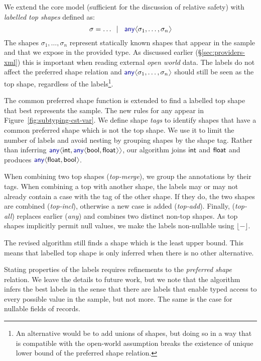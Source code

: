 \documentclass[10pt,nocopyrightspace]{sigplanconf}
\newcommand{\langl}{\begin{picture}(4.5,7)
\put(1.1,2.5){\rotatebox{60}{\line(1,0){5.5}}}
\put(1.1,2.5){\rotatebox{300}{\line(1,0){5.5}}}
\end{picture}}
\newcommand{\rangl}{\begin{picture}(4.5,7)
\put(.9,2.5){\rotatebox{120}{\line(1,0){5.5}}}
\put(.9,2.5){\rotatebox{240}{\line(1,0){5.5}}}
\end{picture}}
\newcommand{\kvd}[1]{\textnormal{\textcolor{kvdclr}{\sffamily #1}}}
\newcommand{\ident}[1]{\textnormal{\sffamily #1}}
\newcommand{\lsep}[0]{\;\; | \;\;}
\newcommand{\dropopt}[1]{\lfloor#1\rfloor}
\begin{document}
We extend the core model (sufficient for the discussion of relative safety) with \emph{labelled top
shapes} defined as:
\begin{equation*}
\sigma = \ldots \lsep \kvd{any}\langl \sigma_1, \ldots, \sigma_n\rangl
\end{equation*}
The shapes $\sigma_1, \ldots, \sigma_n$ represent statically known shapes that appear in the
sample and that we expose in the provided type. As discussed earlier (\S\ref{sec:providers-xml})
this is important when reading external \emph{open world} data. The labels do not affect the
preferred shape relation and $\kvd{any}\langl \sigma_1, \ldots, \sigma_n\rangl$ should still be
seen as the top shape, regardless of the labels\footnote{An alternative would be to add unions of
shapes, but doing so in a way that is compatible with the open-world assumption breaks the
existence of unique lower bound of the preferred shape relation.}.

The common preferred shape function is extended to find a labelled top shape that best represents
the sample. The new rules for \kvd{any} appear in Figure~\ref{fig:subtyping-cst-var}.
We define shape \emph{tags} to identify shapes that have a common preferred shape
which is not the top shape. We use it to limit the number of labels and avoid nesting by grouping
shapes by the shape tag. Rather than inferring $\kvd{any}\langl\ident{int}, \kvd{any}\langl\ident{bool}, \ident{float}\rangl\rangl$,
our algorithm joins $\ident{int}$ and $\ident{float}$ and produces
$\kvd{any}\langl\ident{float},\ident{bool}\rangl$.

When combining two top shapes (\emph{top-merge}), we group the annotations by their tags.
When combining a top with another shape, the labels may or may not already contain a case with
the tag of the other shape. If they do, the two shapes are combined (\emph{top-incl}), otherwise
a new case is added (\emph{top-add}). Finally, (\emph{top-all}) replaces earlier (\emph{any})
and combines two distinct non-top shapes. As top shapes implicitly permit \kvd{null} values,
we make the labels non-nullable using $\dropopt{-}$.

The revised algorithm still finds a shape which is the least upper bound. This means that
labelled top shape is only inferred when there is no other alternative.

Stating properties of the labels requires refinements to the \emph{preferred shape} relation.
We leave the details to future work, but we
note that the algorithm infers the best labels in the sense that there are labels that enable
typed access to every possible value in the sample, but not more. The same is the case for nullable
fields of records.
\end{document}

